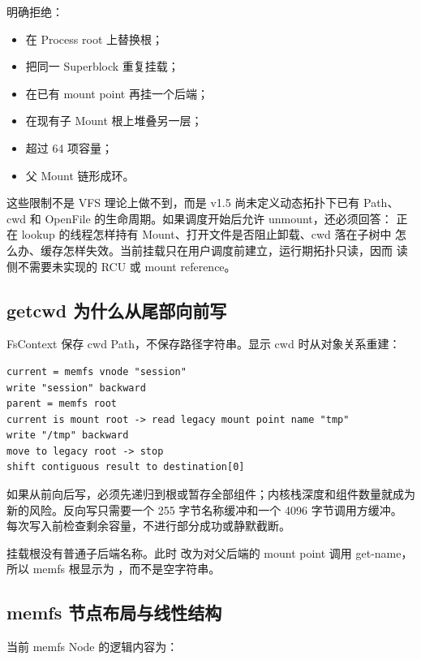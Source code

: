  明确拒绝：

\begin{itemize}
  \item 在 Process root 上替换根；
  \item 把同一 Superblock 重复挂载；
  \item 在已有 mount point 再挂一个后端；
  \item 在现有子 Mount 根上堆叠另一层；
  \item 超过 64 项容量；
  \item 父 Mount 链形成环。
\end{itemize}

这些限制不是 VFS 理论上做不到，而是 v1.5 尚未定义动态拓扑下已有 Path、
cwd 和 OpenFile 的生命周期。如果调度开始后允许 unmount，还必须回答：
正在 lookup 的线程怎样持有 Mount、打开文件是否阻止卸载、cwd 落在子树中
怎么办、缓存怎样失效。当前挂载只在用户调度前建立，运行期拓扑只读，因而
读侧不需要未实现的 RCU 或 mount reference。

\subsection{getcwd 为什么从尾部向前写}

FsContext 保存 cwd Path，不保存路径字符串。显示 cwd 时从对象关系重建：

\begin{lstlisting}[caption={从 /tmp/session 反向取得路径}]
current = memfs vnode "session"
write "session" backward
parent = memfs root
current is mount root -> read legacy mount point name "tmp"
write "/tmp" backward
move to legacy root -> stop
shift contiguous result to destination[0]
\end{lstlisting}

如果从前向后写，必须先递归到根或暂存全部组件；内核栈深度和组件数量就成为
新的风险。反向写只需要一个 255 字节名称缓冲和一个 4096 字节调用方缓冲。
每次写入前检查剩余容量，不进行部分成功或静默截断。

挂载根没有普通子后端名称。此时  改为对父后端的 mount
point 调用 get-name，所以 memfs 根显示为 ，而不是空字符串。

\subsection{memfs 节点布局与线性结构}

当前 memfs Node 的逻辑内容为：

